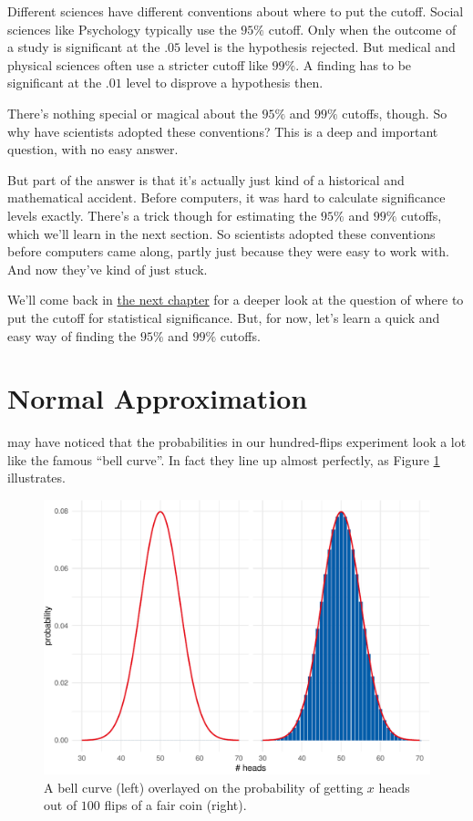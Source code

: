 \documentclass[justified]{tufte-book}
\theoremstyle{definition}
\theoremstyle{definition}
\theoremstyle{definition}
\theoremstyle{remark}
\begin{document}
Different sciences have different conventions about where to put the
cutoff. Social sciences like Psychology typically use the \(95\%\)
cutoff. Only when the outcome of a study is significant at the \(.05\)
level is the hypothesis rejected. But medical and physical sciences
often use a stricter cutoff like \(99\%\). A finding has to be
significant at the \(.01\) level to disprove a hypothesis then.

There's nothing special or magical about the \(95\%\) and \(99\%\)
cutoffs, though. So why have scientists adopted these conventions? This
is a deep and important question, with no easy answer.

But part of the answer is that it's actually just kind of a historical
and mathematical accident. Before computers, it was hard to calculate
significance levels exactly. There's a trick though for estimating the
\(95\%\) and \(99\%\) cutoffs, which we'll learn in the next section. So
scientists adopted these conventions before computers came along, partly
just because they were easy to work with. And now they've kind of just
stuck.

We'll come back in \protect\hyperlink{chlindley}{the next chapter} for a
deeper look at the question of where to put the cutoff for statistical
significance. But, for now, let's learn a quick and easy way of finding
the \(95\%\) and \(99\%\) cutoffs.

\hypertarget{normal-approximation}{%
\section{Normal Approximation}\label{normal-approximation}}

 may have noticed that the probabilities in our
hundred-flips experiment look a lot like the famous ``bell curve''. In
fact they line up almost perfectly, as Figure \ref{fig:napprox}
illustrates.

\begin{figure}
\includegraphics{_main_files/figure-latex/napprox-1} \caption[A bell curve (left) overlayed on the probability of getting $x$ heads out of $100$ flips of a fair coin (right)]{A bell curve (left) overlayed on the probability of getting $x$ heads out of $100$ flips of a fair coin (right).}\label{fig:napprox}
\end{figure}
\end{document}
